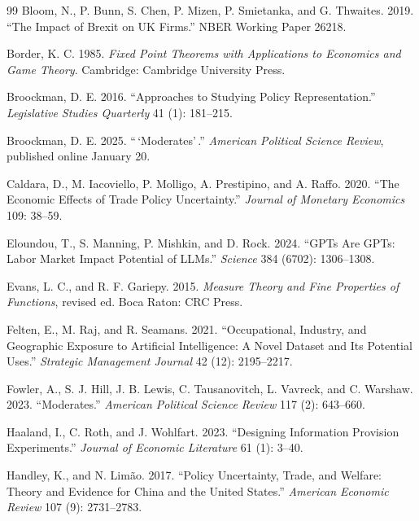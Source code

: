 \documentclass[12pt,letterpaper]{article}
\begin{document}
\begin{thebibliography}{99}
Bloom, N., P. Bunn, S. Chen, P. Mizen, P. Smietanka, and G. Thwaites. 2019. ``The Impact of Brexit on UK Firms.'' NBER Working Paper 26218.

Border, K. C. 1985. \textit{Fixed Point Theorems with Applications to Economics and Game Theory}. Cambridge: Cambridge University Press.

Broockman, D. E. 2016. ``Approaches to Studying Policy Representation.'' \textit{Legislative Studies Quarterly} 41 (1): 181--215.

Broockman, D. E. 2025. ``\,`Moderates'\,.'' \textit{American Political Science Review}, published online January 20.

Caldara, D., M. Iacoviello, P. Molligo, A. Prestipino, and A. Raffo. 2020. ``The Economic Effects of Trade Policy Uncertainty.'' \textit{Journal of Monetary Economics} 109: 38--59.

Eloundou, T., S. Manning, P. Mishkin, and D. Rock. 2024. ``GPTs Are GPTs: Labor Market Impact Potential of LLMs.'' \textit{Science} 384 (6702): 1306--1308.

Evans, L. C., and R. F. Gariepy. 2015. \textit{Measure Theory and Fine Properties of Functions}, revised ed. Boca Raton: CRC Press.

Felten, E., M. Raj, and R. Seamans. 2021. ``Occupational, Industry, and Geographic Exposure to Artificial Intelligence: A Novel Dataset and Its Potential Uses.'' \textit{Strategic Management Journal} 42 (12): 2195--2217.

Fowler, A., S. J. Hill, J. B. Lewis, C. Tausanovitch, L. Vavreck, and C. Warshaw. 2023. ``Moderates.'' \textit{American Political Science Review} 117 (2): 643--660.

Haaland, I., C. Roth, and J. Wohlfart. 2023. ``Designing Information Provision Experiments.'' \textit{Journal of Economic Literature} 61 (1): 3--40.

Handley, K., and N. Lim\~{a}o. 2017. ``Policy Uncertainty, Trade, and Welfare: Theory and Evidence for China and the United States.'' \textit{American Economic Review} 107 (9): 2731--2783.


\end{thebibliography}
\end{document}
